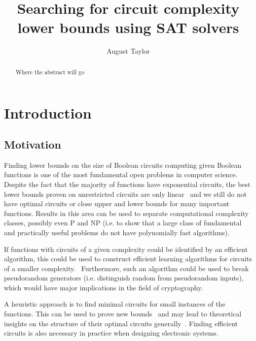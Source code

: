 \documentclass{article}
\begin{document}
\begin{titlepage}
\title{Searching for circuit complexity lower bounds using SAT solvers}
\author{August Taylor}
\maketitle
\end{titlepage}

\begin{abstract}
Where the abstract will go
\end{abstract}

\tableofcontents

\section{Introduction}

\subsection{Motivation}

Finding lower bounds on the size of Boolean circuits computing given Boolean functions is one of the most fundamental open problems in computer science. Despite the fact that the majority of functions have exponential circuits, the best lower bounds proven on unrestricted circuits are only linear~\cite{boppana} and we still do not have optimal circuits or close upper and lower bounds for many important functions. Results in this area can be used to separate computational complexity classes, possibly even P and NP (i.e. to show that a large class of fundamental and practically useful problems do not have polynomially fast algorithms).~\cite{arora} 

If functions with circuits of a given complexity could be identified by an efficient algorithm, this could be used to construct efficient learning algorithms for circuits of a smaller complexity.~\cite{carmosino} Furthermore, such an algorithm could be used to break pseudorandom generators (i.e. distinguish random from pseudorandom inputs), which would have major implications in the field of cryptography.~\cite{arora}

A heuristic approach is to find minimal circuits for small instances of the functions. This can be used to prove new bounds~\cite{kulikovsurvey} and may lead to theoretical insights on the structure of their optimal circuits generally~\cite{williams}. Finding efficient circuits is also necessary in practice when designing electronic systems. 
\end{document}
